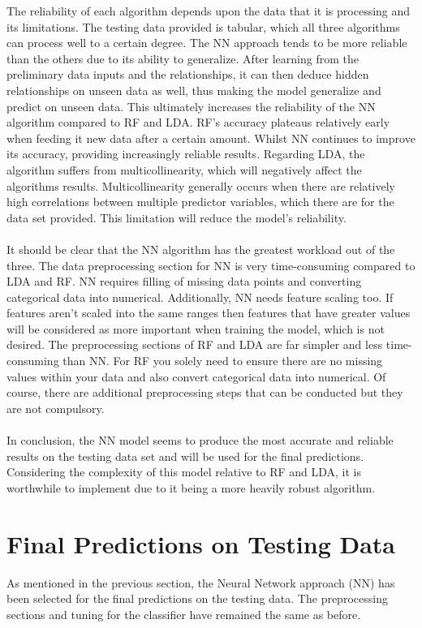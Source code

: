 \documentclass{article}
\begin{document}
The reliability of each algorithm depends upon the data that it is processing and its limitations. The testing data provided is tabular, which all three algorithms can process well to a certain degree. The NN approach tends to be more reliable than the others due to its ability to generalize. After learning from the preliminary data inputs and the relationships, it can then deduce hidden relationships on unseen data as well, thus making the model generalize and predict on unseen data. This ultimately increases the reliability of the NN algorithm compared to RF and LDA. RF’s accuracy plateaus relatively early when feeding it new data after a certain amount. Whilst NN continues to improve its accuracy, providing increasingly reliable results. Regarding LDA, the algorithm suffers from multicollinearity, which will negatively affect the algorithms results. Multicollinearity generally occurs when there are relatively high correlations between multiple predictor variables, which there are for the data set provided. This limitation will reduce the model’s reliability.\\ \\

It should be clear that the NN algorithm has the greatest workload out of the three. The data preprocessing section for NN is very time-consuming compared to LDA and RF. NN requires filling of missing data points and converting categorical data into numerical. Additionally, NN needs feature scaling too. If features aren’t scaled into the same ranges then features that have greater values will be considered as more important when training the model, which is not desired. The preprocessing sections of RF and LDA are far simpler and less time-consuming than NN. For RF you solely need to ensure there are no missing values within your data and also convert categorical data into numerical. Of course, there are additional preprocessing steps that can be conducted but they are not compulsory.\\ \\
 
In conclusion, the NN model seems to produce the most accurate and reliable results on the testing data set and will be used for the final predictions. Considering the complexity of this model relative to RF and LDA, it is worthwhile to implement due to it being a more heavily robust algorithm.

\section{Final Predictions on Testing Data}
As mentioned in the previous section, the Neural Network approach (NN) has been selected for the final predictions on the testing data. The preprocessing sections and tuning for the classifier have remained the same as before.
\end{document}
